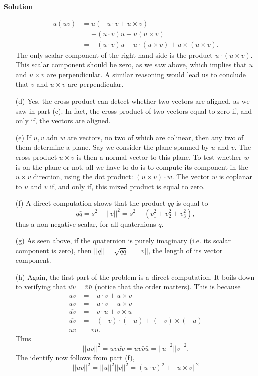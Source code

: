 \documentclass[12pt,oneside]{exam}
\newenvironment{newsolution}{\vspace{.1in}\noindent\textbf{Solution \hspace{.05em}}}{}
\begin{document}
\begin{newsolution}
\begin{itemize}
\begin{align*}
u(uv) & = u ( - u\cdot v + u\times v)\\
& = -(u\cdot v) u + u(u\times v)\\
& = -(u\cdot v) u + u\cdot (u\times v) + u\times (u \times v).
\end{align*}
The only scalar component of the right-hand side is the product $u\cdot(u \times v)$. This scalar component should be zero, as we saw above, which implies that $u$  and $u\times v$ are perpendicular. A similar reasoning would lead us to conclude that $v$ and $u \times v$ are perpendicular. 
\item[(d)] Yes, the cross product can detect whether two vectors are aligned, as we saw in part (c). In fact, the cross product of two vectors equal to zero if, and only if, the vectors are aligned. 
\item[(e)] If $u,v$ adn $w$ are vectors, no two of which are colinear, then any two of them determine a plane. Say we consider the plane spanned by $u$ and $v$. The cross product $u \times v$ is then a normal vector to this plane. To test whether $w$ is on the plane or not, all we have to do is to compute its component in the $u \times v$ direction, using the dot product: $(u \times v) \cdot w$. The vector $w$ is coplanar to $u$ and $v$ if, and only if, this mixed product is equal to zero. 
\item[(f)] A direct computation shows that the product $q\bar{q}$ is equal to 
\begin{equation*}
q\bar{q} = s^2 + ||v||^2 = s^2 + (v_{1}^{2}+v_{2}^{2} + v_{3}^{2}), 
\end{equation*}
thus a non-negative scalar, for all quaternions $q$. 
\item[(g)]  As seen above, if the quaternion is purely imaginary (i.e. its scalar component is zero), then $||q||=\sqrt{q\bar{q}} = ||v||$, the length of its vector component. 
\item[(h)] Again, the first part of the problem is a direct computation. It boils down to verifying that $\overline{uv}=\bar{v}\bar{u}$ (notice that the order matters). This is because
\begin{align*}
uv& =-u\cdot v + u\times v \\ 
\overline{uv} & = -u\cdot v - u \times v \\
\overline{uv} & = -v\cdot u + v \times u \\
\overline{uv} & = -(-v)\cdot (-u) + (-v) \times (-u)\\
\overline{uv} & = \bar{v}\bar{u}.
\end{align*}
Thus
\begin{equation*}
||uv||^2 = uv\overline{uv} = uv \bar{v} \bar{u} = ||u||^2||v||^2.
\end{equation*}
The identify now follows from part (f), 
\begin{equation*}
||uv||^2 = ||u||^2||v||^2 = (u\cdot v)^2 + ||u \times v||^2
\end{equation*}
\end{itemize}
\end{newsolution}
\end{document}

